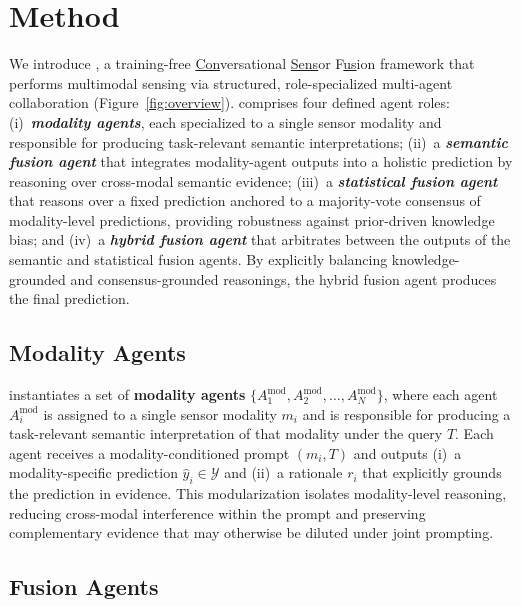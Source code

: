 \section{Method}
\label{sec:method}

We introduce \textbf{\system{}}, a training-free \underline{Con}versational \underline{Sens}or F\underline{us}ion framework that performs multimodal sensing via structured, role-specialized multi-agent collaboration (Figure~\ref{fig:overview}). \system{} comprises four defined agent roles: (i)~\textbf{\textit{modality agents}}, each specialized to a single sensor modality and responsible for producing task-relevant semantic interpretations; (ii)~a \textbf{\textit{semantic fusion agent}} that integrates modality-agent outputs into a holistic prediction by reasoning over cross-modal semantic evidence; (iii)~a \textbf{\textit{statistical fusion agent}} that reasons over a fixed prediction anchored to a majority-vote consensus of modality-level predictions, providing robustness against prior-driven knowledge bias; and (iv)~a \textbf{\textit{hybrid fusion agent}} that arbitrates between the outputs of the semantic and statistical fusion agents. By explicitly balancing knowledge-grounded and consensus-grounded reasonings, the hybrid fusion agent produces the final prediction. 

\subsection{Modality Agents}
\label{sec:method_modality_agents}

\system{} instantiates a set of \textbf{modality agents} $\{A^{\text{mod}}_1, A^{\text{mod}}_2, \ldots, A^{\text{mod}}_N\}$, where each agent $A^{\text{mod}}_i$ is assigned to a single sensor modality $m_i$ and is responsible for producing a task-relevant semantic interpretation of that modality under the query $T$. Each agent receives a modality-conditioned prompt $(m_i, T)$ and outputs (i)~a modality-specific prediction $\hat{y}_i \in \mathcal{Y}$ and (ii)~a rationale $r_i$ that explicitly grounds the prediction in evidence. This modularization isolates modality-level reasoning, reducing cross-modal interference within the prompt and preserving complementary evidence that may otherwise be diluted under joint prompting.

\subsection{Fusion Agents}
\label{sec:method_fusion_agents}

